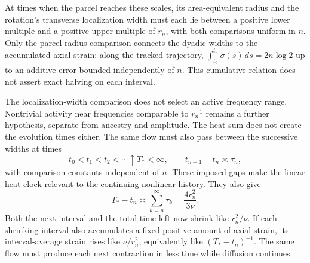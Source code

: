 At times when the parcel reaches these scales, its area-equivalent radius and the rotation's transverse localization width must each lie between a positive lower multiple and a positive upper multiple of \(r_n\), with both comparisons uniform in \(n\). Only the parcel-radius comparison connects the dyadic widths to the accumulated axial strain: along the tracked trajectory, \(\int_{t_0}^{t_n}\sigma(s)\,ds=2n\log 2\) up to an additive error bounded independently of \(n\). This cumulative relation does not assert exact halving on each interval.

The localization-width comparison does not select an active frequency range. Nontrivial activity near frequencies comparable to \(r_n^{-1}\) remains a further hypothesis, separate from ancestry and amplitude. The heat sum does not create the evolution times either. The same flow must also pass between the successive widths at times
\[
  t_0<t_1<t_2<\cdots\uparrow T_*<\infty,
  \qquad
  t_{n+1}-t_n\asymp\tau_n,
\]
with comparison constants independent of \(n\). These imposed gaps make the linear heat clock relevant to the continuing nonlinear history. They also give
\[
  T_*-t_n
  \asymp
  \sum_{k=n}^{\infty}\tau_k
  =
  \frac{4r_n^2}{3\nu}.
\]
Both the next interval and the total time left now shrink like \(r_n^2/\nu\). If each shrinking interval also accumulates a fixed positive amount of axial strain, its interval-average strain rises like \(\nu/r_n^2\), equivalently like \((T_*-t_n)^{-1}\). The same flow must produce each next contraction in less time while diffusion continues.
